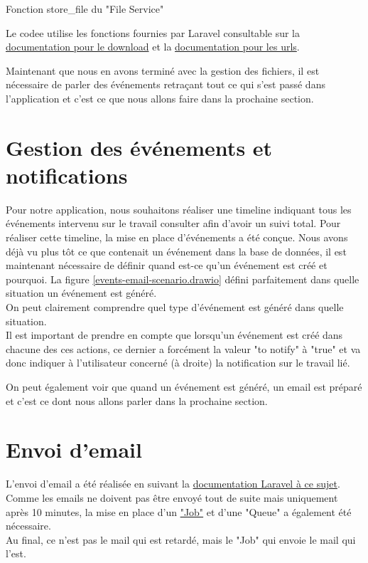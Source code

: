 \documentclass[
    iai, %
    il, %
]{heig-tb}
\begin{document}
\begin{listing}[h]
    \inputminted{php}{assets/code/FileDownload.php}
    \caption{Fonction store_file du "File Service" \label{file-download}}
\end{listing}

Le codee utilise les fonctions fournies par Laravel consultable sur la \href{https://laravel.com/docs/9.x/filesystem#downloading-files}{documentation pour le download} et la \href{https://laravel.com/docs/9.x/filesystem#file-urls}{documentation pour les urls}.

Maintenant que nous en avons terminé avec la gestion des fichiers, il est nécessaire de parler des événements retraçant tout ce qui s'est passé dans l'application et c'est ce que nous allons faire dans la prochaine section.

\section{Gestion des événements et notifications}
Pour notre application, nous souhaitons réaliser une timeline indiquant tous les événements intervenu sur le travail consulter afin d'avoir un suivi total. Pour réaliser cette timeline, la mise en place d'événements a été conçue. Nous avons déjà vu plus tôt ce que contenait un événement dans la base de données, il est maintenant nécessaire de définir quand est-ce qu'un événement est créé et pourquoi. La figure \ref{events-email-scenario.drawio} défini parfaitement dans quelle situation un événement est généré. \\
On peut clairement comprendre quel type d'événement est généré dans quelle situation. \\
Il est important de prendre en compte que lorsqu'un événement est créé dans chacune des ces actions, ce dernier a forcément la valeur "to notify" à "true" et va donc indiquer à l'utilisateur concerné (à droite) la notification sur le travail lié.


On peut également voir que quand un événement est généré, un email est préparé et c'est ce dont nous allons parler dans la prochaine section.

\section{Envoi d'email}
L'envoi d'email a été réalisée en suivant la \href{https://laravel.com/docs/9.x/mail}{documentation Laravel à ce sujet}. \\
Comme les emails ne doivent pas être envoyé tout de suite mais uniquement après 10 minutes, la mise en place d'un \href{https://laravel.com/docs/9.x/queues#creating-jobs}{"Job"} et d'une "Queue" a également été nécessaire. \\
Au final, ce n'est pas le mail qui est retardé, mais le "Job" qui envoie le mail qui l'est.
\end{document}
